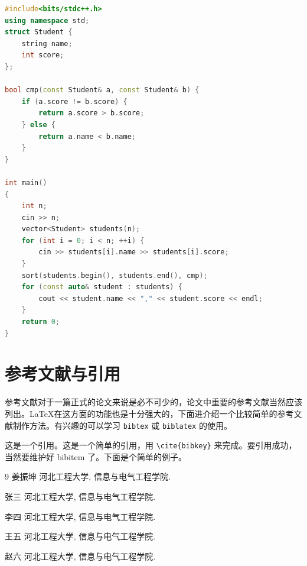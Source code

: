 \begin{lstlisting}[language=c++,caption={C++代码测试}]
#include<bits/stdc++.h>
using namespace std;
struct Student {
	string name;
	int score;
};

bool cmp(const Student& a, const Student& b) {
	if (a.score != b.score) {
		return a.score > b.score;
	} else {
		return a.name < b.name;
	}
}

int main()
{
	int n;
	cin >> n;
	vector<Student> students(n);
	for (int i = 0; i < n; ++i) {
		cin >> students[i].name >> students[i].score;
	}
	sort(students.begin(), students.end(), cmp);
	for (const auto& student : students) {
		cout << student.name << "," << student.score << endl;
	}
	return 0;
}
\end{lstlisting}


\newpage

\section{参考文献与引用}

参考文献对于一篇正式的论文来说是必不可少的，论文中重要的参考文献当然应该列出。\LaTeX{}在这方面的功能也是十分强大的，下面进介绍一个比较简单的参考文献制作方法。有兴趣的可以学习 \verb|bibtex| 或 \verb|biblatex| 的使用。

这是一个引用\cite{testcite1}。这是一个简单的引用，用 \verb|\cite{bibkey}| 来完成。要引用成功，当然要维护好 bibitem 了。下面是个简单的例子。



\begin{thebibliography}{9}%
	姜振坤
	\newblock 河北工程大学,
	\newblock 信息与电气工程学院.
	
	张三
	\newblock 河北工程大学,
	\newblock 信息与电气工程学院.
	
	李四
	\newblock 河北工程大学,
	\newblock 信息与电气工程学院.
	
	王五
	\newblock 河北工程大学,
	\newblock 信息与电气工程学院.
	
	赵六
	\newblock 河北工程大学,
	\newblock 信息与电气工程学院.
	
\end{thebibliography}


